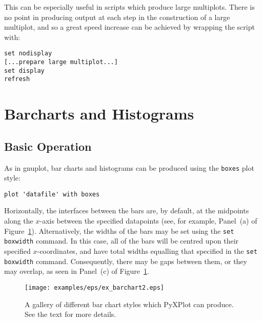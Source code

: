 \documentclass[a4paper,onecolumn,11pt]{book}
\begin{document}
This can be especially useful in scripts which produce large multiplots. There
is no point in producing output at each step in the construction of a large
multiplot, and so a great speed increase can be achieved by wrapping the script
with:

\begin{verbatim} 
set nodisplay
[...prepare large multiplot...]
set display
refresh
\end{verbatim}

\section{Barcharts and Histograms}
\label{barcharts}

\subsection{Basic Operation}

As in gnuplot, bar charts and histograms can be produced using the
\texttt{boxes} plot style:

\begin{verbatim} 
plot 'datafile' with boxes
\end{verbatim}

\noindent Horizontally, the interfaces between the bars are, by default, at the
midpoints along the $x$-axis between the specified datapoints (see, for
example, Panel~(a) of Figure~\ref{fig:ex_barchart2}).  Alternatively, the
widths of the bars may be set using the \texttt{set boxwidth} command. In this
case, all of the bars will be centred upon their specified $x$-coordinates, and
have total widths equalling that specified in the \texttt{set
boxwidth} command.
Consequently, there may be gaps between them, or they may overlap, as seen in
Panel~(c) of Figure~\ref{fig:ex_barchart2}.

\begin{figure}
\begin{center}
\texttt{[image: examples/eps/ex\_barchart2.eps]}
\end{center}
\caption{A gallery of different bar chart styles which PyXPlot can produce. See the text for more details.}
\label{fig:ex_barchart2}
\end{figure}
\end{document}
